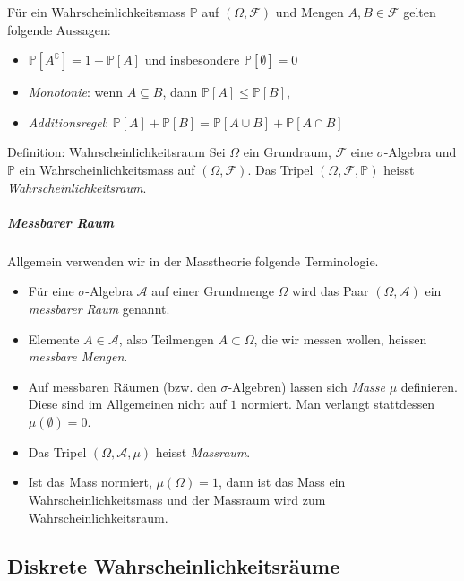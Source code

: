\documentclass[a4paper,10pt]{article}
\def\P{\mathbb{P}}
\begin{document}
\begin{subbox}{}
    Für ein Wahrscheinlichkeitsmass \( \P \) auf \( (\Omega, \mathcal{F}) \) und Mengen \( A, B \in \mathcal{F} \) gelten folgende Aussagen:
    \begin{itemize}
        \item \( \P \left[ A^\complement \right] = 1 - \P[A] \) und insbesondere \( \P[\emptyset] = 0 \)
        \item \emph{Monotonie}: wenn \( A \subseteq B \), dann \( \P[A] \leq \P[B] \),
        \item \emph{Additionsregel}: \( \P[A] + \P[B] = \P[A \cup B] + \P[A \cap B] \)
    \end{itemize}
\end{subbox}

\begin{mainbox}{Definition: Wahrscheinlichkeitsraum}
    Sei \( \Omega \) ein Grundraum, \( \mathcal{F} \) eine \( \sigma \)-Algebra und \( \P \) ein Wahrscheinlichkeitsmass auf \( (\Omega, \mathcal{F}) \). Das Tripel \( (\Omega, \mathcal{F}, \P) \) heisst \emph{Wahrscheinlichkeitsraum}.
\end{mainbox}

\subparagraph{Messbarer Raum} 
Allgemein verwenden wir in der Masstheorie folgende Terminologie.
\begin{itemize}
    \item Für eine \( \sigma \)-Algebra \( \mathcal{A} \) auf einer Grundmenge \( \Omega \) wird das Paar \( (\Omega, \mathcal{A}) \) ein \emph{messbarer Raum} genannt.
    \item Elemente \( A \in \mathcal{A} \), also Teilmengen \( A \subset \Omega \), die wir messen wollen, heissen \emph{messbare Mengen}.
    \item Auf messbaren Räumen (bzw. den \( \sigma \)-Algebren) lassen sich \emph{Masse} \( \mu \) definieren. Diese sind im Allgemeinen nicht auf \( 1 \) normiert. Man verlangt stattdessen \( \mu(\emptyset) = 0 \).
    \item Das Tripel \( (\Omega, \mathcal{A}, \mu) \) heisst \emph{Massraum}.
    \item Ist das Mass normiert, \( \mu(\Omega) = 1 \), dann ist das Mass ein Wahrscheinlichkeitsmass und der Massraum wird zum Wahrscheinlichkeitsraum.
\end{itemize}


\subsection{Diskrete Wahrscheinlichkeitsräume}
\end{document}
